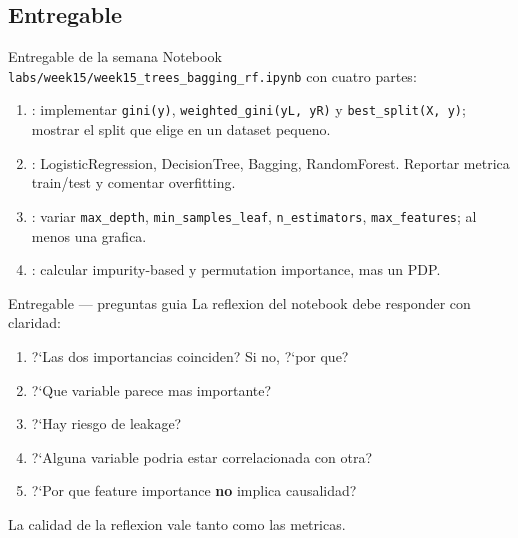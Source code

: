 \subsection{Entregable}

\begin{frame}{Entregable de la semana}
Notebook \texttt{labs/week15/week15\_trees\_bagging\_rf.ipynb} con cuatro partes:
\begin{enumerate}\small
  \item {}: implementar \texttt{gini(y)}, \texttt{weighted\_gini(yL, yR)} y \texttt{best\_split(X, y)}; mostrar el split que elige en un dataset pequeno.
  \item {}: LogisticRegression, DecisionTree, Bagging, RandomForest. Reportar metrica train/test y comentar overfitting.
  \item {}: variar \texttt{max\_depth}, \texttt{min\_samples\_leaf}, \texttt{n\_estimators}, \texttt{max\_features}; al menos una grafica.
  \item {}: calcular impurity-based y permutation importance, mas un PDP.
\end{enumerate}
\end{frame}

\begin{frame}{Entregable — preguntas guia}
La reflexion del notebook debe responder con claridad:
\begin{enumerate}\small
  \item ?`Las dos importancias coinciden? Si no, ?`por que?
  \item ?`Que variable parece mas importante?
  \item ?`Hay riesgo de leakage?
  \item ?`Alguna variable podria estar correlacionada con otra?
  \item ?`Por que feature importance \textbf{no} implica causalidad?
\end{enumerate}

\vspace{0.4em}
{\footnotesize La calidad de la reflexion vale tanto como las metricas.}
\end{frame}

